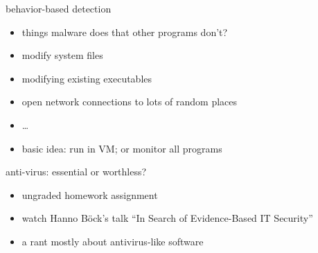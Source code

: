 
\begin{frame}{behavior-based detection}
    \begin{itemize}
    \item things malware does that other programs don't?
    \vspace{.5cm}
    \item<2-> modify system files
    \item<2-> modifying existing executables
    \item<2-> open network connections to lots of random places 
    \item<2-> \ldots
    \vspace{.5cm}
    \item basic idea: run in VM; or monitor all programs
    \end{itemize}
\end{frame}

\begin{frame}{anti-virus: essential or worthless?}
    \begin{itemize}
    \item ungraded homework assignment
    \item watch Hanno B\"ock's talk ``In Search of Evidence-Based IT Security''
    \item a rant mostly about antivirus-like software
    \end{itemize}
\end{frame}


